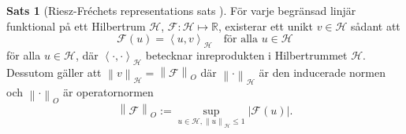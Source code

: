 \documentclass[a4paper, 12pt]{report}
\theoremstyle{definition}
\newtheorem{thm}{Sats}[section]
\theoremstyle{remark}
\begin{document}
\begin{thm}[Riesz-Fréchets representations sats \cite{Young}]
	För varje begränsad linjär funktional på ett Hilbertrum $\mathcal{H}$, $\mathcal{F}: \mathcal{H} \longmapsto \mathbb{R}$, existerar ett unikt $v\in\mathcal{H}$ sådant att
	\begin{equation}
		\mathcal{F}(u)=\left\langle u, v\right\rangle_\mathcal{H}\quad \text{för alla }u\in\mathcal{H}
	\end{equation}
	för alla $u\in\mathcal{H}$, där $\left\langle \cdot, \cdot\right\rangle_\mathcal{H}$ betecknar inreprodukten i Hilbertrummet $\mathcal{H}$.\\
	Dessutom gäller att $\left\| v \right\|_\mathcal{H}=\left\| \mathcal{F}\right\|_O$ där $\left\| \cdot \right\|_\mathcal{H}$ är den inducerade normen och $\left\|\cdot\right\|_O$ är operatornormen \begin{equation*}
	\left\|\mathcal{F}\right\|_O:=\sup_{u\in\mathcal{H},\left\|u\right\|_\mathcal{H}\leq 1}\left|\mathcal{F}(u)\right|.
	\end{equation*}
\end{thm}
\end{document}
